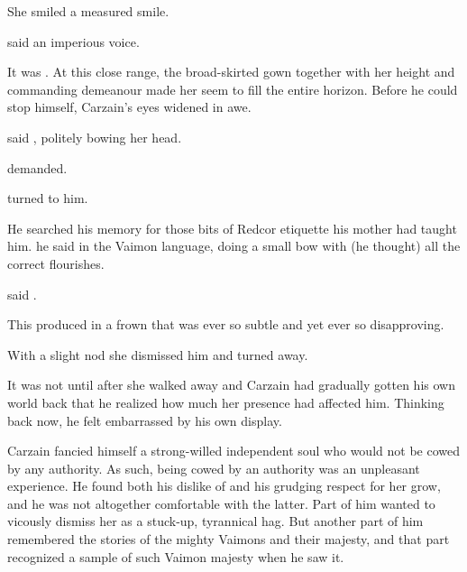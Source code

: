 She smiled a measured smile. 

% 

 said an imperious voice. 

It was \Esmerel. 
At this close range, the broad-skirted gown together with her height and commanding demeanour made her seem to fill the entire horizon. 
Before he could stop himself, Carzain's eyes widened in awe. 

\ta{\Matron{} \Esmerel,} said \Racel, politely bowing her head. 

 \Esmerel{} demanded. 


 \Esmerel{} turned to him. 

He searched his memory for those bits of Redcor etiquette his mother had taught him. 
he said in the Vaimon language, doing a small bow with (he thought) all the correct flourishes. 

 said \Esmerel. 




This produced in \Esmerel{} a frown that was ever so subtle and yet ever so disapproving. 

With a slight nod she dismissed him and turned away. 

It was not until after she walked away and Carzain had gradually gotten his own world back that he realized how much her presence had affected him. 
Thinking back now, he felt embarrassed by his own display. 

Carzain fancied himself a strong-willed independent soul who would not be cowed by any authority. 
As such, being cowed by an authority was an unpleasant experience. 
He found both his dislike of \Chyrie{} \Esmerel{} and his grudging respect for her grow, and he was not altogether comfortable with the latter. 
Part of him wanted to vicously dismiss her as a stuck-up, tyrannical hag. 
But another part of him remembered the stories of the mighty Vaimons and their majesty, and that part recognized a sample of such Vaimon majesty when he saw it. 

